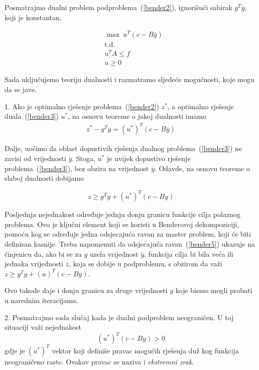 \documentclass[b5paper, utf8, 11pt, colorlinks]{book}
\theoremstyle{definition}
\begin{document}
 
Posmatrajmo dualni problem podproblema~(\ref{bender2}), ignorišući sabirak $g^T\overline{y}$, koji je konstantan.

\begin{equation}
	\begin{aligned}\label{bender3}
	&\max\ u^T (c-B\overline{y})\\
 		& \mbox{t.d.}\\
	&u^TA\leqslant f\\
	&u\geqslant 0
 \end{aligned}
\end{equation}


Sada uključujemo teoriju dualnosti i razmatramo sljedeće mogućnosti, koje mogu da se jave.
 
1. Ako je optimalno rješenje problema~(\ref{bender2}) $z^*$, a optimalno rješenje duala~(\ref{bender3}) $u^*$, na osnovu teoreme o jakoj  dualnosti imamo
  \begin{equation}
	\begin{aligned}\label{bender4}
z^*-g^T\overline{y}=(u^*)^T(c-B\overline{y})
	\end{aligned}
\end{equation}


Dalje, uočimo da oblast dopustivih rješenja dualnog problema~(\ref{bender3}) ne zavisi od vrijednosti $\overline{y}$. Stoga, $u^*$ je uvijek dopustivo rješenje problema~(\ref{bender3}), bez obzira na vrijednost $\overline{y}$. Odavde, na osnovu teoreme o slaboj  dualnosti dobijamo

  \begin{equation}
\label{bender5}
		z\geqslant g^Ty+(u^*)^T(c-By)
\end{equation}


Posljednja nejednakost određuje jednju donju granicu funkcije cilja polaznog problema. Ovo je ključni element koji se koristi u Benderovoj dekompoziciji, pomoću kog se određuje jedna odsjecajuća ravan za master problem, koji će biti definisan kasnije. Treba napomenuti da odsjecajuća ravan~(\ref{bender5}) ukazuje na činjenicu da, ako bi se za $y$ uzela vrijednost $\overline{y}$, funkcija cilja bi bila veća ili jednaka vrijednosti $\overline{z}$, koja se dobije u podproblemu, s obzirom da važi $	z\geqslant g^Ty+(u)^T(c-B\overline{y})$.

Ovo takođe daje i donju granicu za druge vrijednosti $y$ koje bismo mogli probati u narednim iteracijama.

2. Posmatrajmo sada slučaj kada je dualni podproblem neograničen. U toj situaciji važi nejednakost
\begin{equation}
	\label{bender6}
	(u^*)^T(c-By)>0
\end{equation}
gdje je ${(u^*)}^T$ vektor koji definiše pravac mogućih rješenja duž kog funkcija neograničeno raste. Ovakav pravac se naziva i \emph{ekstremni zrak}.
 
\end{document}
